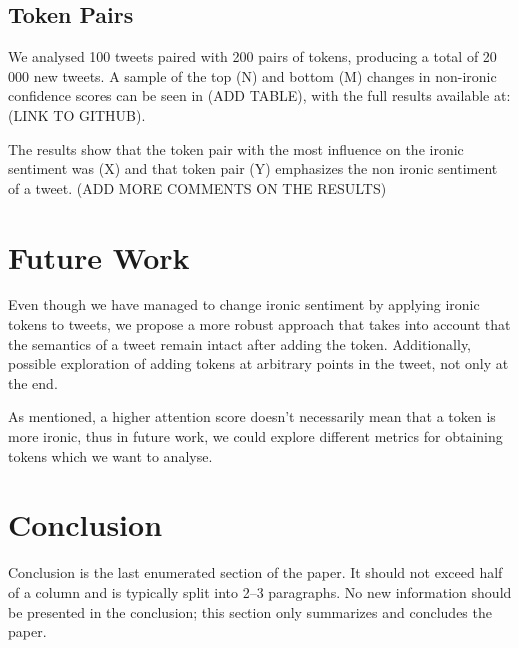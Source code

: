 \documentclass[10pt, a4paper]{article}
\begin{document}
\subsection{Token Pairs}

We analysed 100 tweets paired with 200 pairs of tokens, producing a total of 20 000 new tweets. A sample of the top (N) and bottom (M) changes in non-ironic confidence scores can be seen in (ADD TABLE), with the full results available at: (LINK TO GITHUB).

The results show that the token pair with the most influence on the ironic sentiment was (X) and that token pair (Y) emphasizes the non ironic sentiment of a tweet. (ADD MORE COMMENTS ON THE RESULTS)

\section{Future Work}

Even though we have managed to change ironic sentiment by applying ironic tokens to tweets, we propose a more robust approach that takes into account that the semantics of a tweet remain intact after adding the token.
Additionally, possible exploration of adding tokens at arbitrary points in the tweet, not only at the end.

As mentioned, a higher attention score doesn't necessarily mean that a token is more ironic, thus in future work, we could explore different metrics for obtaining tokens which we want to analyse.

\section{Conclusion}

Conclusion is the last enumerated section of the paper. It should not exceed half of a column and is typically split into 2--3 paragraphs. No new information should be presented in the conclusion; this section only summarizes and concludes the paper.


 
\end{document}
